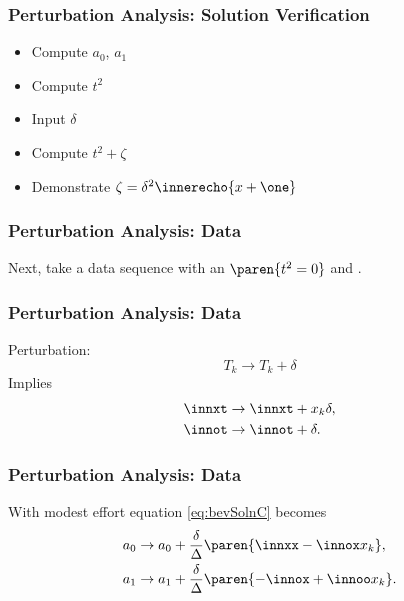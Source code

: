 %
%
\begin{frame}\frametitle{Perturbation Analysis: Solution Verification}
\begin{itemize}
	\item Compute $a_{0}$, $a_{1}$
	\item Compute $t^{2}$
	\item Input $\delta$
	\item Compute $t^{2} + \zeta$
	\item Demonstrate $\zeta=\delta^{2} \innerecho{x+\one} $
\end{itemize}
\end{frame}
%
%
\begin{frame}\frametitle{Perturbation Analysis: Data}
Next, take a data sequence with an  $\paren{t^{2} = 0}$ and .
\end{frame}
%
%
\begin{frame}\frametitle{Perturbation Analysis: Data}
Perturbation:
\begin{equation}
		T_{k} \to T_{k} + \delta
\end{equation}
Implies
\begin{equation}
\begin{split}
	\innxt &\to \innxt + x_{k} \delta , \\
	\innot &\to \innot + \delta. 
\end{split}
\end{equation}
\end{frame}
%
\begin{frame}\frametitle{Perturbation Analysis: Data}
With modest effort equation \ref{eq:bevSolnC} becomes
\begin{equation}
\begin{split}
	a_{0} &\to a_{0} + \frac{\delta}{\Delta} \paren{\innxx - \innox x_{k}} , \\
	a_{1} &\to a_{1} + \frac{\delta}{\Delta} \paren{-\innox + \innoo x_{k}}. 
\end{split}
\end{equation}
\end{frame}
%

%
\endinput  %
